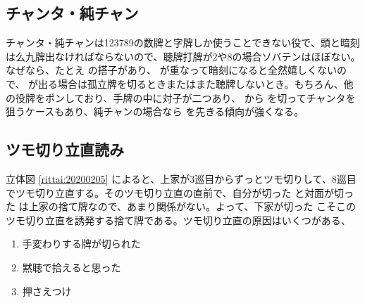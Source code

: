 \documentclass[10pt, twocolumn]{article}
\begin{document}
\subsection{チャンタ・純チャン}

チャンタ・純チャンは123789の数牌と字牌しか使うことできない役で、頭と暗刻は么九牌出なければならないので、聴牌打牌が2や8の場合ソバテンはほぼない\citep[][p.~74]{takizawa-yomi}。なぜなら、たとえ  の搭子があり、 が重なって暗刻になると全然嬉しくないので、 が出る場合は孤立牌を切るときまたはまた聴牌しないとき。もちろん、他の役牌をポンしており、手牌の中に対子が二つあり、 から  を切ってチャンタを狙うケースもあり、純チャンの場合なら  を先きる傾向が強くなる。


\subsection{ツモ切り立直読み}

\begin{rittai}[h]
  \centering
  
  
  \caption{Mリーグ2020 2/5 第2回戦 南1局 1本場（ツモ切り暗転は上家だけ）\citep[][p.~111]{muhai}}
  \label{rittai:20200205}
\end{rittai}

立体図 \ref{rittai:20200205} によると、上家が3巡目からずっとツモ切りして、8巡目でツモ切り立直する。そのツモ切り立直の直前で、自分が切った  と対面が切った  は上家の捨て牌なので、あまり関係がない。よって、下家が切った  こそこのツモ切り立直を誘発する捨て牌である。ツモ切り立直の原因はいくつがある、

\begin{enumerate}
  \item 手変わりする牌が切られた
  \item 黙聴で拾えると思った
  \item 押さえつけ
\end{enumerate}
\end{document}
